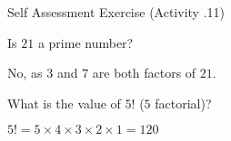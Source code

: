 \documentclass[\main/notes.tex]{subfiles}
\begin{document}
\begin{exercise}{Self Assessment Exercise (Activity \thechapter.11)}
\begin{questions}
\begin{answer}
						\end{answer}
					\item Is $21$ a prime number?\\
						\begin{answer}
							No, as $3$ and $7$ are both factors of $21$.
						\end{answer}
					\item What is the value of $5!$ ($5$ factorial)?\\
						\begin{answer}
							$5! = 5 \times 4 \times 3 \times 2 \times 1 = 120$
						\end{answer}
				\end{questions}
			\end{exercise}
\end{document}
